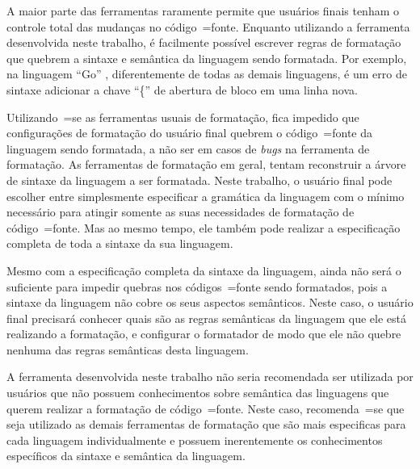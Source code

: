 {    A maior parte das ferramentas raramente permite que usuários finais tenham o controle total das mudanças no código~=fonte.
    Enquanto utilizando a ferramenta desenvolvida neste trabalho,
    é facilmente possível escrever regras de formatação que quebrem a sintaxe e
    semântica da linguagem sendo formatada.
    Por exemplo,
    na linguagem ``Go'' \cite{programmingLanguageGolang},
    diferentemente de todas as demais linguagens,
    é um erro de sintaxe adicionar a chave ``\{'' de abertura de bloco em uma linha nova.

    Utilizando~=se as ferramentas usuais de formatação,
    fica impedido que configurações de formatação do usuário final quebrem o código~=fonte da linguagem sendo formatada,
    a não ser em casos de \textit{bugs} na ferramenta de formatação.
    As ferramentas de formatação em geral,
    tentam reconstruir a árvore de sintaxe da linguagem a ser formatada.
    Neste trabalho,
    o usuário final pode escolher entre simplesmente especificar a gramática da linguagem com o mínimo necessário para atingir somente as suas necessidades de formatação de código~=fonte.
    Mas ao mesmo tempo,
    ele também pode realizar a especificação completa de toda a sintaxe da sua linguagem.

    Mesmo com a especificação completa da sintaxe da linguagem,
    ainda não será o suficiente para impedir quebras nos códigos~=fonte sendo formatados,
    pois a sintaxe da linguagem não cobre os seus aspectos semânticos.
    Neste caso,
    o usuário final precisará conhecer quais são as regras semânticas da linguagem que ele está realizando a formatação,
    e configurar o formatador de modo que ele não quebre nenhuma das regras semânticas desta linguagem.

    A ferramenta desenvolvida neste trabalho não seria recomendada ser utilizada por usuários que não possuem conhecimentos sobre semântica das linguagens que querem realizar a formatação de código~=fonte.
    Neste caso,
    recomenda~=se que seja utilizado as demais ferramentas de formatação que são mais especificas para cada linguagem individualmente e
    possuem inerentemente os conhecimentos específicos da sintaxe e
    semântica da linguagem.
}


\chapter{}

